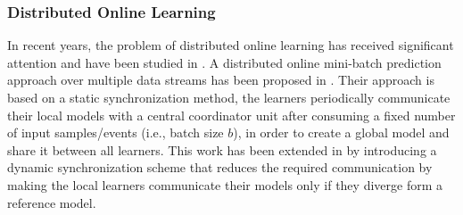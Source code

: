 
\subsubsection*{Distributed Online Learning}
\par In recent years, the problem of distributed online learning has received significant attention and have been studied in \cite{langford2009slow,yan2013distributed,xiao2010dual,dekel2012optimal,kamp2014communication}.  A distributed online mini-batch prediction approach over multiple data streams has been proposed in \cite{dekel2012optimal}. Their approach is based on a static synchronization method,  the learners periodically communicate  their local models with a central coordinator unit after consuming a fixed number of input samples/events (i.e., batch size $b$), in order to  create a global model and share it between all learners. This work has been extended in \cite{kamp2014communication} by introducing a
dynamic synchronization scheme that reduces the required communication by making the local learners communicate their models only if they diverge form a reference model. 

